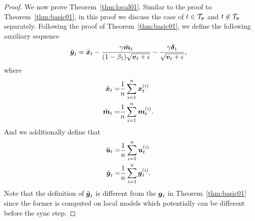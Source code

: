 \begin{proof}
We now prove Theorem~\ref{thm:local01}. 
Similar to the proof to Theorem~\ref{thm:basic01}, in this proof we discuss the case of $t\in\mathcal{T}_{\boldsymbol{v}}$ and $t\not\in\mathcal{T}_{\boldsymbol{v}}$ separately.
Following the proof of Theorem~\ref{thm:basic01}, we define the following auxiliary sequence
\begin{align*}
    \tilde{\boldsymbol{y}}_t = \tilde{\boldsymbol{x}}_t - \frac{\gamma\tilde{\boldsymbol{m}}_t}{(1-\beta_1)\sqrt{\boldsymbol{v}_{t}+\epsilon}} - \frac{\gamma\boldsymbol{\delta}_{t}}{\sqrt{\boldsymbol{v}_{t}+\epsilon}},
\end{align*}
where
\begin{align*}
    \tilde{\boldsymbol{x}}_t = &  \frac{1}{n}\sum_{i=1}^{n}\boldsymbol{x}^{(i)}_t \\
    \tilde{\boldsymbol{m}}_t = &  \frac{1}{n}\sum_{i=1}^{n}\boldsymbol{m}^{(i)}_t.
\end{align*}
And we additionally define that
\begin{align*}
    \tilde{\boldsymbol{u}}_t = &  \frac{1}{n}\sum_{i=1}^{n}\boldsymbol{u}^{(i)}_t \\
    \tilde{\boldsymbol{g}}_t = &  \frac{1}{n}\sum_{i=1}^{n}\boldsymbol{g}^{(i)}_t.
\end{align*}
Note that the definition of $\tilde{\boldsymbol{g}}_t$ is different from the ${\boldsymbol{g}}_t$ in Theorem~\ref{thm:basic01} since the former is computed on local models which potentially can be different before the sync step.


\end{proof}
